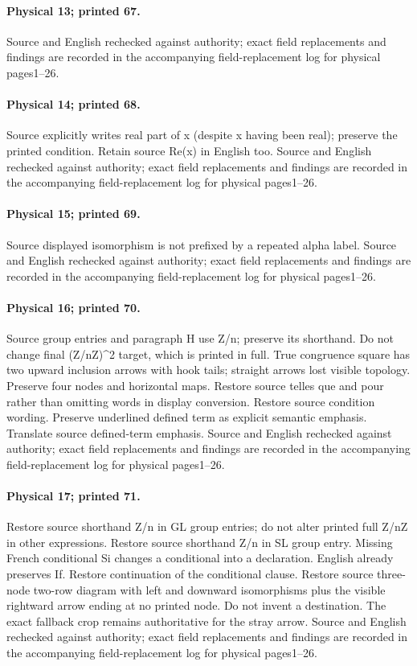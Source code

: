 \documentclass[10pt,a4paper]{article}
\begin{document}
\paragraph{Physical 13; printed 67.} Source and English rechecked against authority; exact field replacements and findings are recorded in the accompanying field-replacement log for physical pages1--26.
\paragraph{Physical 14; printed 68.} Source explicitly writes real part of x (despite x having been real); preserve the printed condition. Retain source Re(x) in English too. Source and English rechecked against authority; exact field replacements and findings are recorded in the accompanying field-replacement log for physical pages1--26.
\paragraph{Physical 15; printed 69.} Source displayed isomorphism is not prefixed by a repeated alpha label. Source and English rechecked against authority; exact field replacements and findings are recorded in the accompanying field-replacement log for physical pages1--26.
\paragraph{Physical 16; printed 70.} Source group entries and paragraph H use Z/n; preserve its shorthand. Do not change final (Z/nZ)\textasciicircum{}2 target, which is printed in full. True congruence square has two upward inclusion arrows with hook tails; straight arrows lost visible topology. Preserve four nodes and horizontal maps. Restore source telles que and pour rather than omitting words in display conversion. Restore source condition wording. Preserve underlined defined term as explicit semantic emphasis. Translate source defined-term emphasis. Source and English rechecked against authority; exact field replacements and findings are recorded in the accompanying field-replacement log for physical pages1--26.
\paragraph{Physical 17; printed 71.} Restore source shorthand Z/n in GL group entries; do not alter printed full Z/nZ in other expressions. Restore source shorthand Z/n in SL group entry. Missing French conditional Si changes a conditional into a declaration. English already preserves If. Restore continuation of the conditional clause. Restore source three-node two-row diagram with left and downward isomorphisms plus the visible rightward arrow ending at no printed node. Do not invent a destination. The exact fallback crop remains authoritative for the stray arrow. Source and English rechecked against authority; exact field replacements and findings are recorded in the accompanying field-replacement log for physical pages1--26.
\end{document}
